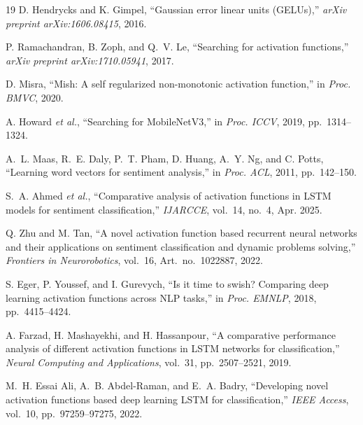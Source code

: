 \documentclass[conference,a4paper]{IEEEtran}
\begin{document}
{\begin{thebibliography}{19}
D. Hendrycks and K. Gimpel,
``Gaussian error linear units (GELUs),''
\textit{arXiv preprint arXiv:1606.08415}, 2016.

P. Ramachandran, B. Zoph, and Q.~V. Le,
``Searching for activation functions,''
\textit{arXiv preprint arXiv:1710.05941}, 2017.

D. Misra,
``Mish: A self regularized non-monotonic activation function,''
in \textit{Proc. BMVC}, 2020.

A. Howard \textit{et al.},
``Searching for MobileNetV3,''
in \textit{Proc. ICCV}, 2019, pp.~1314--1324.



A.~L. Maas, R.~E. Daly, P.~T. Pham, D. Huang, A.~Y. Ng, and C. Potts,
``Learning word vectors for sentiment analysis,''
in \textit{Proc. ACL}, 2011, pp.~142--150.

S.~A. Ahmed \textit{et al.},
``Comparative analysis of activation functions in LSTM models for sentiment
classification,''
\textit{IJARCCE}, vol.~14, no.~4, Apr. 2025.

Q. Zhu and M. Tan,
``A novel activation function based recurrent neural networks and their
applications on sentiment classification and dynamic problems solving,''
\textit{Frontiers in Neurorobotics}, vol.~16, Art.~no.~1022887, 2022.



S. Eger, P. Youssef, and I. Gurevych,
``Is it time to swish? Comparing deep learning activation functions across
NLP tasks,''
in \textit{Proc. EMNLP}, 2018, pp.~4415--4424.

A. Farzad, H. Mashayekhi, and H. Hassanpour,
``A comparative performance analysis of different activation functions in
LSTM networks for classification,''
\textit{Neural Computing and Applications}, vol.~31,
pp.~2507--2521, 2019.

M.~H. Essai Ali, A.~B. Abdel-Raman, and E.~A. Badry,
``Developing novel activation functions based deep learning LSTM for
classification,''
\textit{IEEE Access}, vol.~10, pp.~97259--97275, 2022.

\end{thebibliography}
}
\end{document}

